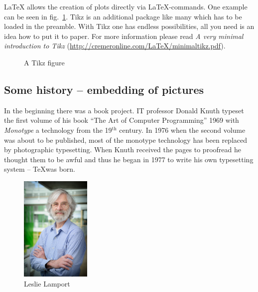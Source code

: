 \documentclass[11pt, a4paper]{article}
\newcommand{\ltx}{\LaTeX}
\begin{document}
\ltx{} allows the creation of plots directly via \ltx-commands. One example can be seen in fig.~\ref{fig:tikz}. Tikz is an additional package like many which has to be loaded in the
preamble. With Tikz one has endless possibilities, all you need is an idea how to put it to paper. For more information please read \textit{A very minimal introduction to Tikz} (\url{http://cremeronline.com/LaTeX/minimaltikz.pdf}).
%
\begin{figure}[t]
\centering
{}
\caption{A Tikz figure\label{fig:tikz}}
\end{figure}


\subsection{Some history -- embedding of pictures}
In the beginning there was a book project. IT professor Donald Knuth typeset the first volume of his book ``The Art of Computer Programming'' 1969 with \textit{Monotype} a technology from the 19\(^{\text{th}}\) century. In 1976 when the second volume was about to be published, most of the monotype technology has been replaced by photographic typesetting. When Knuth received the pages to proofread he thought them to be awful and thus he began in 1977 to write his own typesetting system -- \TeX was born.

\begin{figure}[htb]
\centering
\includegraphics[width=0.3\textwidth]{Leslie_Lamportd}
\caption{Leslie Lamport\label{fig:LL}}
\end{figure}
\end{document}
